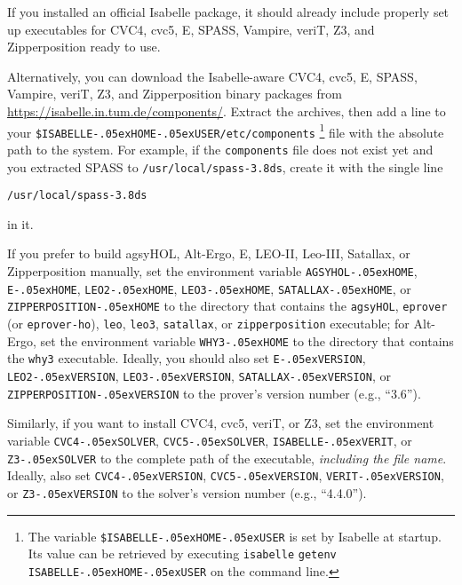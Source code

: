 \documentclass[a4paper,12pt]{article}
\newcommand\download{\url{https://isabelle.in.tum.de/components/}}
\renewcommand\_{\hbox{\textunderscore\kern-.05ex}}
\begin{document}
\begin{sloppy}
\begin{enum}
\item[\labelitemi] If you installed an official Isabelle package, it should
already include properly set up executables for CVC4, cvc5, E, SPASS, Vampire,
veriT, Z3, and Zipperposition ready to use.

\item[\labelitemi] Alternatively, you can download the Isabelle-aware CVC4,
cvc5, E, SPASS, Vampire, veriT, Z3, and Zipperposition binary packages from
\download. Extract the archives, then add a line to your
\texttt{\$ISABELLE\_HOME\_USER\slash etc\slash components}%
\footnote{The variable \texttt{\$ISABELLE\_HOME\_USER} is set by Isabelle at
startup. Its value can be retrieved by executing \texttt{isabelle}
\texttt{getenv} \texttt{ISABELLE\_HOME\_USER} on the command line.}
file with the absolute path to the system. For example, if the
\texttt{components} file does not exist yet and you extracted SPASS to
\texttt{/usr/local/spass-3.8ds}, create it with the single line

\prew
\texttt{/usr/local/spass-3.8ds}
\postw

in it.

\item[\labelitemi] If you prefer to build agsyHOL, Alt-Ergo, E, LEO-II,
Leo-III, Satallax, or Zipperposition manually, set the environment variable
\texttt{AGSYHOL\_HOME}, \texttt{E\_HOME}, \texttt{LEO2\_HOME},
\texttt{LEO3\_HOME}, \texttt{SATALLAX\_HOME}, or \texttt{ZIPPERPOSITION\_HOME}
to the directory that contains the \texttt{agsyHOL},
\texttt{eprover} (or \texttt{eprover-ho}),
\texttt{leo}, \texttt{leo3}, \texttt{satallax}, or \texttt{zipperposition}
executable; for Alt-Ergo, set the environment variable \texttt{WHY3\_HOME} to the
directory that contains the \texttt{why3} executable. Ideally, you
should also set \texttt{E\_VERSION}, \texttt{LEO2\_VERSION},
\texttt{LEO3\_VERSION}, \texttt{SATALLAX\_VERSION}, or
\texttt{ZIPPERPOSITION\_VERSION} to the prover's version number (e.g., ``3.6'').

Similarly, if you want to install CVC4, cvc5, veriT, or Z3, set the environment
variable \texttt{CVC4\_\allowbreak SOLVER}, \texttt{CVC5\_\allowbreak SOLVER},
\texttt{ISABELLE\_\allowbreak VERIT},
or \texttt{Z3\_SOLVER} to the complete path of the executable, \emph{including
the file name}. Ideally, also set \texttt{CVC4\_VERSION}, \texttt{CVC5\_VERSION},
\texttt{VERIT\_VERSION}, or \texttt{Z3\_VERSION} to the solver's version number
(e.g., ``4.4.0'').
\end{enum}
\end{sloppy}
\end{document}
